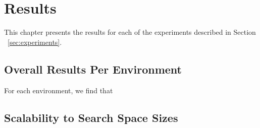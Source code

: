 \chapter{Results}
\label{cha:results}


% 
% 






This chapter presents the results for each of the experiments described in Section ~\ref{sec:experiments}.

\section{Overall Results Per Environment}

For each environment, we find that 

\section{Scalability to Search Space Sizes}

